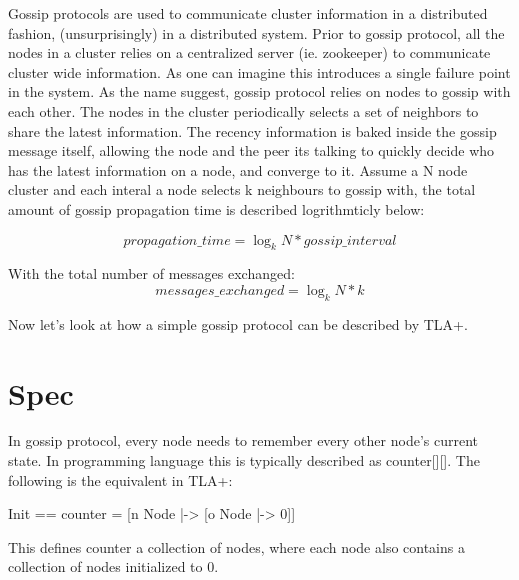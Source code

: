 \documentclass{report}
\begin{document}
Gossip protocols are used to communicate cluster information in a distributed
fashion, (unsurprisingly) in a distributed system. Prior to gossip protocol, all
the nodes in a cluster relies on a centralized server (ie. zookeeper) to
communicate cluster wide information. As one can imagine this introduces a
single failure point in the system. As the name suggest, gossip protocol relies
on nodes to gossip with each other. The nodes in the cluster periodically
selects a set of neighbors to share the latest information. The recency
information is baked inside the gossip message itself, allowing the node and the
peer its talking to quickly decide who has the latest information on a node, and
converge to it. Assume a N node cluster and each interal a node selects k
neighbours to gossip with, the total amount of gossip propagation time is
described logrithmticly below:

\begin{equation} 
    propagation\_time = \log_k N * gossip\_interval
\end{equation}

With the total number of messages exchanged: 
\begin{equation} 
    messages\_exchanged = \log_k N * k
\end{equation}

Now let's look at how a simple gossip protocol can be described by TLA+.

\section{Spec}

In gossip protocol, every node needs to remember every other node's current
state. In programming language this is typically described as counter[][]. The following is
the equivalent in TLA+: 
\begin{tla}
    Init == counter = [n \in Node |-> [o \in Node |-> 0]] 
\end{tla}
\begin{tlatex}
\end{tlatex}

This defines counter a collection of nodes, where each node also contains a
collection of nodes initialized to 0.\newline
\end{document}
